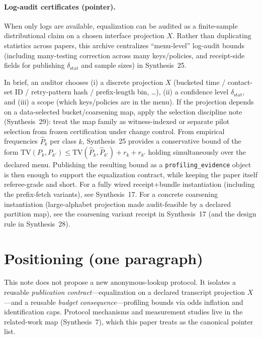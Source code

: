 \documentclass[11pt]{article}
\newcommand{\TV}{\mathrm{TV}}
\begin{document}
\paragraph{Log-audit certificates (pointer).}
When only logs are available, equalization can be audited as a finite-sample distributional claim on a chosen interface projection $X$.
Rather than duplicating statistics across papers, this archive centralizes ``menu-level'' log-audit bounds (including many-testing correction across many keys/policies, and receipt-side fields for publishing $\delta_{\mathrm{stat}}$ and sample sizes) in Synthesis~25.\cite{series:stataudit}

In brief, an auditor chooses (i) a discrete projection $X$ (bucketed time / contact-set ID / retry-pattern hash / prefix-length bin, \dots), (ii) a confidence level $\delta_{\mathrm{stat}}$, and (iii) a scope (which keys/policies are in the menu).
If the projection depends on a data-selected bucket/coarsening map, apply the selection discipline note (Synthesis~29): treat the map family as witness-indexed or separate pilot selection from frozen certification under change control.\cite{series:selectiondiscipline}
From empirical frequencies $\widehat P_k$ per class $k$, Synthesis~25 provides a conservative bound of the form
$\TV(P_k,P_{k'}) \le \TV(\widehat P_k,\widehat P_{k'}) + r_k + r_{k'}$
holding simultaneously over the declared menu.
Publishing the resulting bound as a \texttt{profiling\_evidence} object is then enough to support the equalization contract, while keeping the paper itself referee-grade and short.
For a fully wired receipt+bundle instantiation (including the prefix-fetch variants), see Synthesis~17.\cite{series:workedexample}
For a concrete coarsening instantiation (large-alphabet projection made audit-feasible by a declared partition map), see the coarsening variant receipt in Synthesis~17 (and the design rule in Synthesis~28).\cite{series:coarsening}

\section{Positioning (one paragraph)}
This note does not propose a new anonymous-lookup protocol.
It isolates a reusable \emph{publication contract}---equalization on a declared transcript projection $X$---and a reusable \emph{budget consequence}---profiling bounds via odds inflation and identification caps.
Protocol mechanisms and measurement studies live in the related-work map (Synthesis~7), which this paper treats as the canonical pointer list.\cite{series:relatedworkmap}
\end{document}
